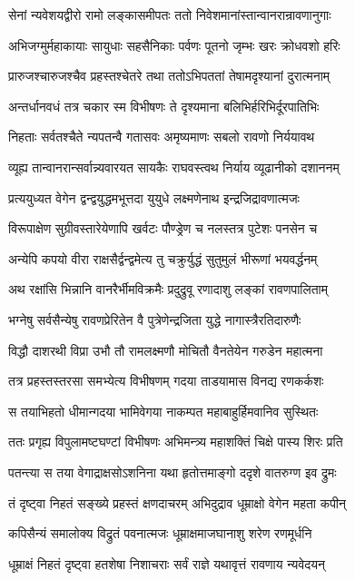 \twolineshloka
{सेनां न्यवेशयद्वीरो रामो लङ्कासमीपतः}
{ततो निवेशमानांस्तान्वानरान्रावणानुगाः}%

\twolineshloka
{अभिजग्मुर्महाकायाः सायुधाः सहसैनिकाः}
{पर्वणः पूतनो जृम्भः खरः क्रोधवशो हरिः}%

\twolineshloka
{प्रारुजश्चारुजश्चैव प्रहस्तश्चेतरे तथा}
{ततोऽभिपततां तेषामदृश्यानां दुरात्मनाम्}%

\twolineshloka
{अन्तर्धानवधं तत्र चकार स्म विभीषणः}
{ते दृश्यमाना बलिभिर्हरिभिर्दूरपातिभिः}%

\twolineshloka
{निहताः सर्वतश्चैते न्यपतन्वै गतासवः}
{अमृष्यमाणः सबलो रावणो निर्ययावथ}%

\twolineshloka
{व्यूह्य तान्वानरान्सर्वान्न्यवारयत सायकैः}
{राघवस्त्वथ निर्याय व्यूढानीको दशाननम्}%

\twolineshloka
{प्रत्ययुध्यत वेगेन द्वन्द्वयुद्धमभूत्तदा}
{युयुधे लक्ष्मणेनाथ इन्द्रजिद्रावणात्मजः}%

\twolineshloka
{विरूपाक्षेण सुग्रीवस्तारेयेणापि खर्वटः}
{पौण्ड्रेण च नलस्तत्र पुटेशः पनसेन च}%

\twolineshloka
{अन्येपि कपयो वीरा राक्षसैर्द्वन्द्वमेत्य तु}
{चक्रुर्युद्धं सुतुमुलं भीरूणां भयवर्द्धनम्}%

\twolineshloka
{अथ रक्षांसि भिन्नानि वानरैर्भीमविक्रमैः}
{प्रदुद्रुवू रणादाशु लङ्कां रावणपालिताम्}%

\twolineshloka
{भग्नेषु सर्वसैन्येषु रावणप्रेरितेन वै}
{पुत्रेणेन्द्रजिता युद्धे नागास्त्रैरतिदारुणैः}%

\twolineshloka
{विद्धौ दाशरथी विप्रा उभौ तौ रामलक्ष्मणौ}
{मोचितौ वैनतेयेन गरुडेन महात्मना}%

\twolineshloka
{तत्र प्रहस्तस्तरसा समभ्येत्य विभीषणम्}
{गदया ताडयामास विनद्य रणकर्कशः}%

\twolineshloka
{स तयाभिहतो धीमान्गदया भामिवेगया}
{नाकम्पत महाबाहुर्हिमवानिव सुस्थितः}%

\twolineshloka
{ततः प्रगृह्य विपुलामष्टघण्टां विभीषणः}
{अभिमन्त्र्य महाशक्तिं चिक्षे पास्य शिरः प्रति}%

\twolineshloka
{पतन्त्या स तया वेगाद्राक्षसोऽशनिना यथा}
{हृतोत्तमाङ्गो ददृशे वातरुग्ण इव द्रुमः}%

\twolineshloka
{तं दृष्ट्वा निहतं सङ्ख्ये प्रहस्तं क्षणदाचरम्}
{अभिदुद्राव धूम्राक्षो वेगेन महता कपीन्}%

\twolineshloka
{कपिसैन्यं समालोक्य विद्रुतं पवनात्मजः}
{धूम्राक्षमाजघानाशु शरेण रणमूर्धनि}%

\twolineshloka
{धूम्राक्षं निहतं दृष्ट्वा हतशेषा निशाचराः}
{सर्वं राज्ञे यथावृत्तं रावणाय न्यवेदयन्}%

